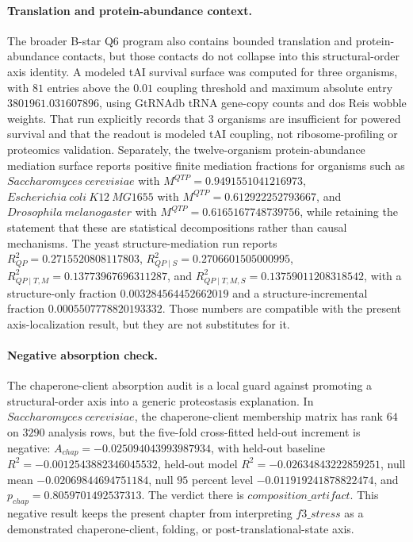 \paragraph{Translation and protein-abundance context.}
The broader B-star Q6 program also contains bounded translation and protein-abundance contacts, but those contacts do not collapse into this structural-order axis identity.  A modeled tAI survival surface was computed for three organisms, with $81$ entries above the $0.01$ coupling threshold and maximum absolute entry $3801961.031607896$, using GtRNAdb tRNA gene-copy counts and dos Reis wobble weights.  That run explicitly records that $3$ organisms are insufficient for powered survival and that the readout is modeled tAI coupling, not ribosome-profiling or proteomics validation.  Separately, the twelve-organism protein-abundance mediation surface reports positive finite mediation fractions for organisms such as $Saccharomyces\ cerevisiae$ with $M^{QTP}=0.9491551041216973$, $Escherichia\ coli\ K12\ MG1655$ with $M^{QTP}=0.612922252793667$, and $Drosophila\ melanogaster$ with $M^{QTP}=0.6165167748739756$, while retaining the statement that these are statistical decompositions rather than causal mechanisms.  The yeast structure-mediation run reports $R^2_{QP}=0.2715520808117803$, $R^2_{QP\mid S}=0.2706601505000995$, $R^2_{QP\mid T,M}=0.13773967696311287$, and $R^2_{QP\mid T,M,S}=0.13759011208318542$, with a structure-only fraction $0.003284564452662019$ and a structure-incremental fraction $0.0005507778820193332$.  Those numbers are compatible with the present axis-localization result, but they are not substitutes for it.

\paragraph{Negative absorption check.}
The chaperone-client absorption audit is a local guard against promoting a structural-order axis into a generic proteostasis explanation.  In $Saccharomyces\ cerevisiae$, the chaperone-client membership matrix has rank $64$ on $3290$ analysis rows, but the five-fold cross-fitted held-out increment is negative: $A_{chap}=-0.025094043993987934$, with held-out baseline $R^2=-0.0012543882346045532$, held-out model $R^2=-0.02634843222859251$, null mean $-0.02069844694751184$, null $95$ percent level $-0.011919241878822474$, and $p_{chap}=0.8059701492537313$.  The verdict there is $composition\_artifact$.  This negative result keeps the present chapter from interpreting $f3\_stress$ as a demonstrated chaperone-client, folding, or post-translational-state axis.

